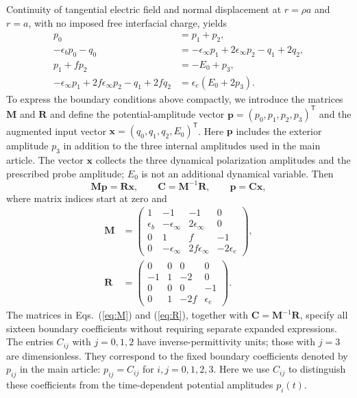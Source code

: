 \documentclass[9pt]{osa-supplemental-document}
\begin{document}
Continuity of tangential electric field and normal displacement at $r=\rho a$ and $r=a$, with no imposed free interfacial charge, yields
\begin{align}
p_0&=p_1+p_2,\label{eq:bc1}\\
-\epsilon_bp_0-q_0&=-\epsilon_\infty p_1+2\epsilon_\infty p_2-q_1+2q_2,\label{eq:bc2}\\
p_1+fp_2&=-E_0+p_3,\label{eq:bc3}\\
-\epsilon_\infty p_1+2f\epsilon_\infty p_2-q_1+2fq_2
&=\epsilon_e(E_0+2p_3).\label{eq:bc4}
\end{align}
To express the boundary conditions above compactly, we introduce the matrices $\mathbf M$ and $\mathbf R$ and define the potential-amplitude vector $\mathbf p=(p_0,p_1,p_2,p_3)^{\mathsf T}$ and the augmented input vector $\mathbf x=(q_0,q_1,q_2,E_0)^{\mathsf T}$. Here $\mathbf p$ includes the exterior amplitude $p_3$ in addition to the three internal amplitudes used in the main article. The vector $\mathbf x$ collects the three dynamical polarization amplitudes and the prescribed probe amplitude; $E_0$ is not an additional dynamical variable. Then
\begin{equation}
\mathbf M\mathbf p=\mathbf R\mathbf x,\qquad
\mathbf C=\mathbf M^{-1}\mathbf R,\qquad \mathbf p=\mathbf C\mathbf x,
\label{eq:coefficientmap}
\end{equation}
where matrix indices start at zero and
\begin{align}
\mathbf M&=\begin{pmatrix}
1&-1&-1&0\\
\epsilon_b&-\epsilon_\infty&2\epsilon_\infty&0\\
0&1&f&-1\\
0&-\epsilon_\infty&2f\epsilon_\infty&-2\epsilon_e
\end{pmatrix},\label{eq:M}\\
\mathbf R&=\begin{pmatrix}
0&0&0&0\\
-1&1&-2&0\\
0&0&0&-1\\
0&1&-2f&\epsilon_e
\end{pmatrix}.\label{eq:R}
\end{align}
The matrices in Eqs.~(\ref{eq:M}) and (\ref{eq:R}), together with $\mathbf C=\mathbf M^{-1}\mathbf R$, specify all sixteen boundary coefficients without requiring separate expanded expressions. The entries $C_{ij}$ with $j=0,1,2$ have inverse-permittivity units; those with $j=3$ are dimensionless. They correspond to the fixed boundary coefficients denoted by $p_{ij}$ in the main article: $p_{ij}=C_{ij}$ for $i,j=0,1,2,3$. Here we use $C_{ij}$ to distinguish these coefficients from the time-dependent potential amplitudes $p_i(t)$.
\end{document}
